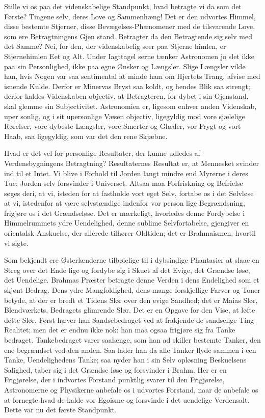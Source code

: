 \documentclass[12pt]{book}
\newcommand{\opage}[1]{\marginnote{\footnotesize\textit{[#1]}}}
\begin{document}
Stille vi os paa det videnskabelige Standpunkt, hvad
betragte vi da som det Første? Tingene selv, deres
Love og Sammenhæng! Det er den udvortes Himmel,
disse bestemte Stjerner, disse Bevægelses-Phænomener
med de tilsvarende Love, som ere Betragtningens Gjen\-%
stand. Betragter da den Betragtende sig selv med det
Samme? Nei, for den, der videnskabelig seer paa Stjerne\-%
himlen, er Stjernehimlen Eet og Alt. Under Iagttagel\-%
serne tænker Astronomen jo slet ikke paa sin Personlighed,
ikke paa egne Ønsker og Længsler. Slige Længsler
vilde han, hvis Nogen var saa sentimental at minde ham
om Hjertets Trang, afvise med isnende Kulde. Derfor
er Minervas Bryst saa koldt, og hendes Blik saa strengt;
derfor kaldes Videnskaben objectiv, at Betragteren, for\-%
dybet i sin Gjenstand, skal glemme sin Subjectivitet.
Astronomien er, ligesom enhver anden Videnskab, uper\-%
sonlig, og i sit upersonlige Væsen objectiv, ligegyldig mod
vore sjælelige Rørelser, vore dybeste Længsler, vore Smerter
og Glæder, vor Frygt og vort Haab, saa ligegyldig, som
var det den rene Skjæbne.

Hvad er det vel for personlige Resultater, der kunne
udledes af Verdensbygningens Betragtning? Resultaternes
Resultat er, at Mennesket svinder ind til et Intet. Vi
blive i Forhold til Jorden langt mindre end Myrerne i
deres Tue; Jorden selv forsvinder i Universet. Altsaa
maa Forfriskning og Befrielse søges deri, at vi, isteden\-%
\opage{199}\setcounter{footnote}{0}%
for at fastholde vort eget Selv, fortabe os i det Selvløse
at vi, istedenfor at være selvstændige indenfor vor person\-%
lige Begrændsning, frigjøre os i det Grændseløse. Det er
mærkeligt, hvorledes denne Fordybelse i Himmelrummets
ydre Uendelighed, denne sublime Selvfortabelse, gjengiver
en orientalsk Anskuelse, der allerede tilhører Oldtiden;
det er Brahmaismen, hvortil vi sigte.

Som bekjendt ere Østerlænderne tilbøielige til i
dybsindige Phantasier at slaae en Streg over det Ende\-%
lige og fordybe sig i Skuet af det Evige, det Grændse\-%
løse, det Uendelige. Brahmas Præster betragte denne
Verden i dens Endelighed som et skjønt Bedrag. Dens ydre
Mangfoldighed, dens mange forskjellige Farver og Toner
betyde, at der er bredt et Tidens Slør over den evige
Sandhed; det er Maias Slør, Blendværkets, Bedragets
glimrende Slør. Det er en Opgave for den Vise, at
løfte dette Slør. Først hæver han Sandsebedraget ved
at frakjende de sandselige Ting Realitet; men det er
endnu ikke nok: han maa ogsaa frigjøre sig fra Tanke\-%
bedraget. Tankebedraget varer saalænge, som han ad\-%
skiller bestemte Tanker, den ene begrændset ved den
anden. Saa lader han da alle Tanker flyde sammen i een
Tanke, Uendelighedens Tanke; saa nyder han i sin Selv\-%
opløsning Beskuelsens Salighed, taber sig i det Grændse\-%
løse og forsvinder i Brahm. Her er en Frigjørelse, der
i indvortes Forstand punktlig svarer til den Frigjørelse,
Astronomerne og Physikerne anbefale os i udvortes
Forstand, naar de anbefale os at fornegte hvad de kalde
vor Egoisme og forsvinde i det uendelige Verdensalt.
Dette var nu det første Standpunkt.
\end{document}

